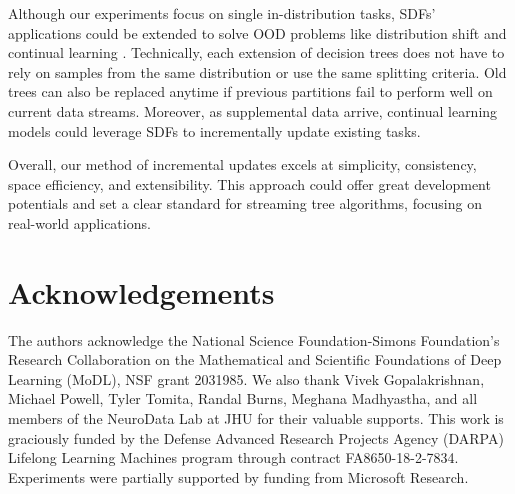 Although our experiments focus on single in-distribution tasks, SDFs' applications could be extended to solve OOD problems like distribution shift and continual learning \citep{geisa_towards_2021, van_de_ven_three_2019}. 
Technically, each extension of decision trees does not have to rely on samples from the same distribution or use the same splitting criteria. Old trees can also be replaced anytime if previous partitions fail to perform well on current data streams. Moreover, as supplemental data arrive, continual learning models could leverage SDFs to incrementally update existing tasks.

Overall, our method of incremental updates excels at simplicity, consistency, space efficiency, and extensibility. This approach could offer great development potentials and set a clear standard for streaming tree algorithms, focusing on real-world applications.

\section*{Acknowledgements}
The authors acknowledge the National Science Foundation-Simons Foundation’s Research Collaboration on the Mathematical and Scientific Foundations of Deep Learning (MoDL), NSF grant 2031985. We also thank Vivek Gopalakrishnan, Michael Powell, Tyler Tomita, Randal Burns, Meghana Madhyastha, and all members of the NeuroData Lab at JHU for their valuable supports. This work is graciously funded by the Defense Advanced Research Projects Agency (DARPA) Lifelong Learning Machines program through contract FA8650-18-2-7834. Experiments were partially supported by funding from Microsoft Research.